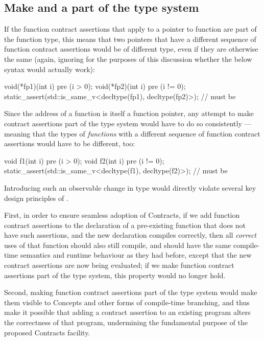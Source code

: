 \subsection{Make  and  a part of the type system}
\label{subsec:maketype}

If the function contract assertions that apply to a pointer to function are part of the function type, this means that two pointers that have a different sequence of function contract assertions would be of different type, even if they are otherwise the same (again, ignoring for the purposes of this discussion whether the below syntax would actually work):
\begin{codeblock}
void(*fp1)(int i) pre (i > 0);
void(*fp2)(int i) pre (i != 0);
static_assert(std::is_same_v<decltype(fp1), decltype(fp2)>);  // must be 
\end{codeblock}
Since the address of a function is itself a function pointer, any attempt to make contract assertions part of the type system would have to do so consistently --- meaning that the types of \emph{functions} with a different sequence of function contract assertions would have to be different, too:
\begin{codeblock}
void f1(int i) pre (i > 0);
void f2(int i) pre (i != 0);
static_assert(std::is_same_v<decltype(f1), decltype(f2)>);  // must be 
\end{codeblock}
Introducing such an observable change in type would directly violate several key design principles of \cite{P2900R7}.

First, in order to ensure seamless adoption of Contracts, if we add function contract assertions to the declaration of a pre-existing function that does not have such assertions, and the new declaration compiles correctly, then all \emph{correct} uses of that function should also still compile, and should have the same compile-time semantics and runtime behaviour as they had before, except that the new contract assertions are now being evaluated; if we make function contract assertions part of the type system, this property would no longer hold.

Second, making function contract assertions part of the type system would make them visible to Concepts and other forms of compile-time branching, and thus make it possible that adding a contract assertion to an existing program alters the correctness of that program, undermining the fundamental purpose of the proposed Contracts facility.

